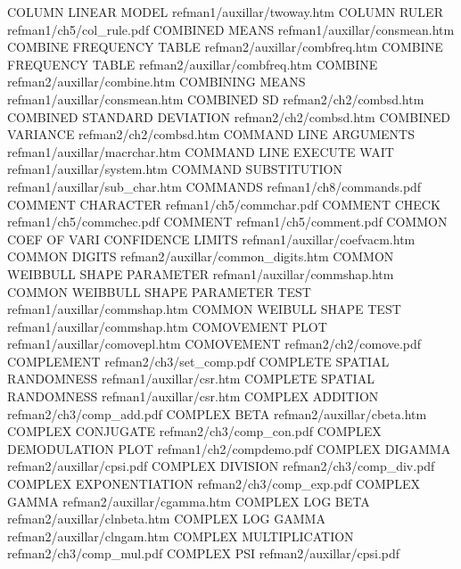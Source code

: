 COLUMN LINEAR MODEL                     refman1/auxillar/twoway.htm
COLUMN RULER                            refman1/ch5/col_rule.pdf
COMBINED MEANS                          refman1/auxillar/consmean.htm
COMBINE FREQUENCY TABLE                 refman2/auxillar/combfreq.htm
COMBINE FREQUENCY TABLE                 refman2/auxillar/combfreq.htm
COMBINE                                 refman2/auxillar/combine.htm
COMBINING MEANS                         refman1/auxillar/consmean.htm
COMBINED SD                             refman2/ch2/combsd.htm
COMBINED STANDARD DEVIATION             refman2/ch2/combsd.htm
COMBINED VARIANCE                       refman2/ch2/combsd.htm
COMMAND LINE ARGUMENTS                  refman1/auxillar/macrchar.htm
COMMAND LINE EXECUTE WAIT               refman1/auxillar/system.htm
COMMAND SUBSTITUTION                    refman1/auxillar/sub_char.htm
COMMANDS                                refman1/ch8/commands.pdf
COMMENT CHARACTER                       refman1/ch5/commchar.pdf
COMMENT CHECK                           refman1/ch5/commchec.pdf
COMMENT                                 refman1/ch5/comment.pdf
COMMON COEF OF VARI CONFIDENCE LIMITS   refman1/auxillar/coefvacm.htm
COMMON DIGITS                           refman2/auxillar/common_digits.htm
COMMON WEIBBULL SHAPE PARAMETER         refman1/auxillar/commshap.htm
COMMON WEIBBULL SHAPE PARAMETER TEST    refman1/auxillar/commshap.htm
COMMON WEIBULL SHAPE TEST               refman1/auxillar/commshap.htm
COMOVEMENT PLOT                         refman1/auxillar/comovepl.htm
COMOVEMENT                              refman2/ch2/comove.pdf
COMPLEMENT                              refman2/ch3/set_comp.pdf
COMPLETE SPATIAL RANDOMNESS             refman1/auxillar/csr.htm
COMPLETE SPATIAL RANDOMNESS             refman1/auxillar/csr.htm
COMPLEX ADDITION                        refman2/ch3/comp_add.pdf
COMPLEX BETA                            refman2/auxillar/cbeta.htm
COMPLEX CONJUGATE                       refman2/ch3/comp_con.pdf
COMPLEX DEMODULATION PLOT               refman1/ch2/compdemo.pdf
COMPLEX DIGAMMA                         refman2/auxillar/cpsi.pdf
COMPLEX DIVISION                        refman2/ch3/comp_div.pdf
COMPLEX EXPONENTIATION                  refman2/ch3/comp_exp.pdf
COMPLEX GAMMA                           refman2/auxillar/cgamma.htm
COMPLEX LOG BETA                        refman2/auxillar/clnbeta.htm
COMPLEX LOG GAMMA                       refman2/auxillar/clngam.htm
COMPLEX MULTIPLICATION                  refman2/ch3/comp_mul.pdf
COMPLEX PSI                             refman2/auxillar/cpsi.pdf
